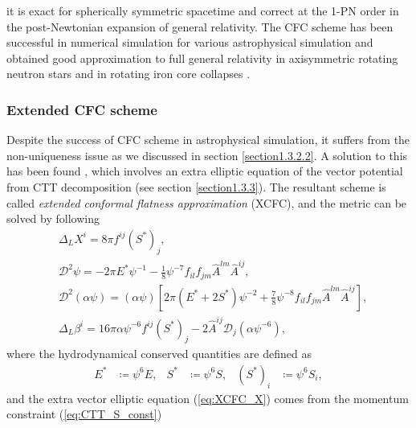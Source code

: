 it is exact for spherically symmetric spacetime \cite{cordero2011maximal} and
correct at the 1-PN order in the post-Newtonian expansion of general relativity.
The CFC scheme has been successful in numerical simulation for various astrophysical simulation
\cite{dimmelmeier2002relativistic,oechslin2002conformally,saijo2004collapse,bauswein2012equation,bauswein2013systematics,bauswein2014revealing,muller2015dynamics,dimmelmeier2006non} 
and obtained good approximation to full general relativity in axisymmetric rotating neutron stars 
\cite{dimmelmeier2002relativistic,dimmelmeier2006non,cook1996testing}
and in rotating iron core collapses \cite{ott2007rotating}.

\subsubsection{Extended CFC scheme}
Despite the success of CFC scheme in astrophysical simulation,
it suffers from the non-uniqueness issue as we discussed in section \ref{section1.3.2.2}.
A solution to this has been found \cite{cordero2009improved,saijo2004collapse,shibata2006merger},
which involves an extra elliptic equation of the vector potential from CTT decomposition (see section \ref{section1.3.3}).
The resultant scheme is called \textit{extended conformal flatness approximation} (XCFC),
and the metric can be solved by following
\begin{align}
    & \Delta_L X^i = 8\pi f^{ij} \left(S^{*}\right)_j, \label{eq:XCFC_X}\\
    & \mathcal{D}^2 \psi = - 2\pi E^{*} \psi^{-1} - \frac{1}{8} \psi^{-7}f_{il}f_{jm} \hat{A}^{lm} \hat{A}^{ij}, \label{eq:XCFC_psi}\\
    & \mathcal{D}^2 \left(\alpha \psi \right) = \left( \alpha \psi \right) \left[ 2\pi \left( E^{*} + 2 S^{*} \right) \psi^{-2}
    + \frac{7}{8} \psi^{-8} f_{il}f_{jm} \hat{A}^{lm} \hat{A}^{ij} \right], \label{eq:XCFC_alp}\\
    & \Delta_L \beta^i = 16 \pi \alpha \psi^{-6} f^{ij} \left(S^{*}\right)_{j} - 2 \hat{A}^{ij} \mathcal{D}_j \left(\alpha \psi^{-6} \right), \label{eq:XCFC_beta}
\end{align}
where the hydrodynamical conserved quantities are defined as
\begin{align}
    E^* &\coloneqq \psi^6 E, & S^* & \coloneqq \psi^6 S, & \left(S^*\right)_i &\coloneqq \psi^6 S_i,
\end{align}
and the extra vector elliptic equation (\ref{eq:XCFC_X}) comes from the momentum constraint (\cref{eq:CTT_S_const}) 
